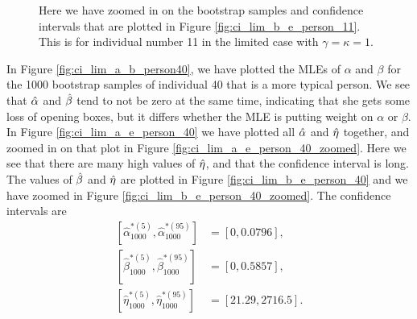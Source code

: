 \begin{figure}
\begin{minipage}{0.48\textwidth}
        \caption[MLEs for $\beta$ and $\eta$ of bootstrap samples individual 11, limited, zoomed]{Here we have zoomed in on the bootstrap samples and confidence intervals that are plotted in Figure \ref{fig:ci_lim_b_e_person_11}. This is for individual number 11 in the limited case with $\gamma=\kappa=1$.}
        \label{fig:ci_lim_b_e_person_11_zoomed}
    \end{minipage}
\end{figure}

In Figure \ref{fig:ci_lim_a_b_person40}, we have plotted the MLEs of $\alpha$ and $\beta$ for the 1000 bootstrap samples of individual 40 that is a more typical person. We see that $\hat{\alpha}$ and $\hat{\beta}$ tend to not be zero at the same time, indicating that she gets some loss of opening boxes, but it differs whether the MLE is putting weight on $\alpha$ or $\beta$. In Figure \ref{fig:ci_lim_a_e_person_40} we have plotted all $\hat{\alpha}$ and $\hat{\eta}$ together, and zoomed in on that plot in Figure \ref{fig:ci_lim_a_e_person_40_zoomed}. Here we see that there are many high values of $\hat{\eta}$, and that the confidence interval is long. The values of $\hat{\beta}$ and $\hat{\eta}$ are plotted in Figure \ref{fig:ci_lim_b_e_person_40} and we have zoomed in Figure \ref{fig:ci_lim_b_e_person_40_zoomed}. 
The confidence intervals are 
\begin{equation*}
    \begin{aligned}
         \left[ \hat{\alpha}^{*(5)}_{1000},\hat{\alpha}^{*(95)}_{1000}\right] &= [0,0.0796],\\
         \left[\hat{\beta}^{*(5)}_{1000},\hat{\beta}^{*(95)}_{1000}\right] &= [0,0.5857],\\
         \left[\hat{\eta}^{*(5)}_{1000},\hat{\eta}^{*(95)}_{1000}\right] &= [21.29,2716.5].
    \end{aligned}
\end{equation*}
